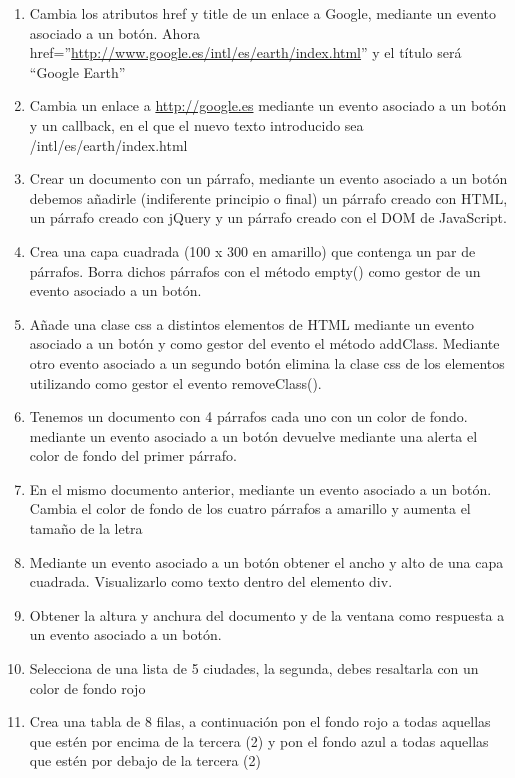 \documentclass[a4paper, oneside]{article}
\begin{document}
\begin{enumerate}
\item Cambia los atributos href y title de un enlace a Google, mediante un evento asociado a un botón. Ahora href=”\url{http://www.google.es/intl/es/earth/index.html}” y el título será “Google Earth”

\item Cambia un enlace a \url{http://google.es} mediante un evento asociado a un botón y un callback, en el que el nuevo texto introducido sea /intl/es/earth/index.html

\item Crear un documento con un párrafo, mediante un evento asociado a un botón debemos añadirle (indiferente principio o final) un párrafo creado con HTML, un párrafo creado con jQuery y un párrafo creado con el DOM de JavaScript.

\item Crea una capa cuadrada (100 x 300 en amarillo) que contenga un par de párrafos. Borra dichos párrafos con el método empty() como gestor de un evento asociado a un botón.

\item Añade una clase css a distintos elementos de HTML mediante un evento asociado a un botón y como gestor del evento el método addClass. Mediante otro evento asociado a un segundo botón elimina la clase css de los elementos utilizando como gestor el evento removeClass().

\item Tenemos un documento con 4 párrafos cada uno con un color de fondo. mediante un evento asociado a un botón devuelve mediante una alerta el color de fondo del primer párrafo.

\item En el mismo documento anterior, mediante un evento asociado a un botón. Cambia el color de fondo de los cuatro párrafos a amarillo y aumenta el tamaño de la letra

\item Mediante un evento asociado a un botón obtener el ancho y alto de una capa cuadrada. Visualizarlo como texto dentro del elemento div.

\item Obtener la altura y anchura del documento y de la ventana como respuesta a un evento asociado a un botón.

\item Selecciona de una lista de 5 ciudades, la segunda,  debes resaltarla  con un color de fondo rojo

\item Crea una tabla de 8 filas, a continuación pon el fondo rojo a todas aquellas que estén por encima de la tercera (2) y pon el fondo azul a todas aquellas que estén por debajo de la tercera (2)


\end{enumerate}
\end{document}
